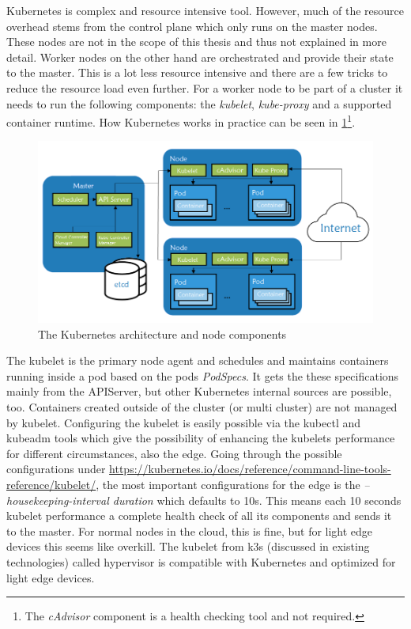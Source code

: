 Kubernetes is complex and resource intensive tool. However, much of the resource overhead stems from the control plane which only runs on the master nodes. These nodes are not in the scope of this thesis and thus not explained in more detail. Worker nodes on the other hand are orchestrated and provide their state to the master. This is a lot less resource intensive and there are a few tricks to reduce the resource load even further. For a worker node to be part of a cluster it needs to run the following components: the \textit{kubelet}, \textit{kube-proxy} and a supported container runtime. How Kubernetes works in practice can be seen in \cref{fig:nodeComponents}\footnote{The \textit{cAdvisor} component is a health checking tool and not required.}.
\begin{figure}[h!]
    \centering
    \includegraphics[scale=0.6]{figures/rancherK8sComponents.png}
    \caption{The Kubernetes architecture and node components\cite{nodeSetupKubernetes:online}}
    \label{fig:nodeComponents}
\end{figure}
The kubelet is the primary node agent and schedules and maintains containers running inside a pod based on the pods \textit{PodSpecs}. It gets the these specifications mainly from the APIServer, but other Kubernetes internal sources are possible, too. Containers created outside of the cluster (or multi cluster) are not managed by kubelet. Configuring the kubelet is easily possible via the kubectl and kubeadm tools which give the possibility of enhancing the kubelets performance for different circumstances, also the edge. Going through the possible configurations under \url{https://kubernetes.io/docs/reference/command-line-tools-reference/kubelet/}, the most important configurations for the edge is the \textit{--housekeeping-interval duration} which defaults to 10s\cite{rancherKubernetesComponents:online}. This means each 10 seconds kubelet performance a complete health check of all its components and sends it to the master. For normal nodes in the cloud, this is fine, but for light edge devices this seems like overkill. The kubelet from k3s (discussed in existing technologies) called hypervisor is compatible with Kubernetes and optimized for light edge devices.\\
